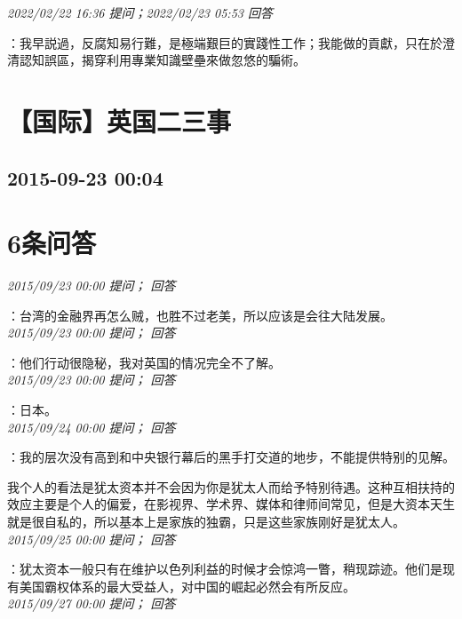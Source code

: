 \documentclass[twocolumn]{ctexart}
\begin{document}
\textit{\hfill\noindent\small 2022/02/22 16:36 提问；2022/02/23 05:53 回答}

：我早説過，反腐知易行難，是極端艱巨的實踐性工作；我能做的貢獻，只在於澄清認知誤區，揭穿利用專業知識壁壘來做忽悠的騙術。
\\


\section{【国际】英国二三事}
\subsection{2015-09-23 00:04}


\section{6条问答}

\textit{\hfill\noindent\small 2015/09/23 00:00 提问； 回答}

：台湾的金融界再怎么贼，也胜不过老美，所以应该是会往大陆发展。\\

\textit{\hfill\noindent\small 2015/09/23 00:00 提问； 回答}

：他们行动很隐秘，我对英国的情况完全不了解。\\

\textit{\hfill\noindent\small 2015/09/23 00:00 提问； 回答}

：日本。\\

\textit{\hfill\noindent\small 2015/09/24 00:00 提问； 回答}

：我的层次没有高到和中央银行幕后的黑手打交道的地步，不能提供特别的见解。

我个人的看法是犹太资本并不会因为你是犹太人而给予特别待遇。这种互相扶持的效应主要是个人的偏爱，在影视界、学术界、媒体和律师间常见，但是大资本天生就是很自私的，所以基本上是家族的独霸，只是这些家族刚好是犹太人。\\

\textit{\hfill\noindent\small 2015/09/25 00:00 提问； 回答}

：犹太资本一般只有在维护以色列利益的时候才会惊鸿一瞥，稍现踪迹。他们是现有美国霸权体系的最大受益人，对中国的崛起必然会有所反应。\\

\textit{\hfill\noindent\small 2015/09/27 00:00 提问； 回答}
\end{document}
